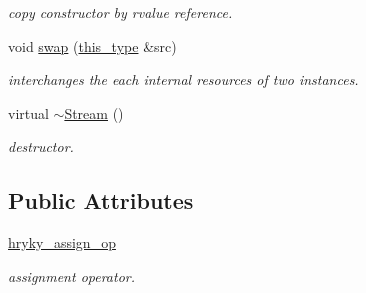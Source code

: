\begin{DoxyCompactItemize}
\begin{DoxyCompactList}\small\item\em copy constructor by rvalue reference. \end{DoxyCompactList}\item 
\hypertarget{classhryky_1_1reduction_1_1_stream_a1149a619a2f584d1ae737010aefb54ca}{void \hyperlink{classhryky_1_1reduction_1_1_stream_a1149a619a2f584d1ae737010aefb54ca}{swap} (\hyperlink{classhryky_1_1reduction_1_1_dispatcher_a8a3ef8b3aa55fc7139de687a9be4f693}{this\-\_\-type} \&src)}\label{classhryky_1_1reduction_1_1_stream_a1149a619a2f584d1ae737010aefb54ca}

\begin{DoxyCompactList}\small\item\em interchanges the each internal resources of two instances. \end{DoxyCompactList}\item 
\hypertarget{classhryky_1_1reduction_1_1_stream_a868cb56653b1cfee77a157a2ea7fe783}{virtual \hyperlink{classhryky_1_1reduction_1_1_stream_a868cb56653b1cfee77a157a2ea7fe783}{$\sim$\-Stream} ()}\label{classhryky_1_1reduction_1_1_stream_a868cb56653b1cfee77a157a2ea7fe783}

\begin{DoxyCompactList}\small\item\em destructor. \end{DoxyCompactList}\end{DoxyCompactItemize}
\subsection*{Public Attributes}
\begin{DoxyCompactItemize}
\item 
\hypertarget{classhryky_1_1reduction_1_1_stream_ad2abb48059b135cae9e8f5fe87138a2a}{\hyperlink{classhryky_1_1reduction_1_1_stream_ad2abb48059b135cae9e8f5fe87138a2a}{hryky\-\_\-assign\-\_\-op}}\label{classhryky_1_1reduction_1_1_stream_ad2abb48059b135cae9e8f5fe87138a2a}

\begin{DoxyCompactList}\small\item\em assignment operator. \end{DoxyCompactList}\end{DoxyCompactItemize}
